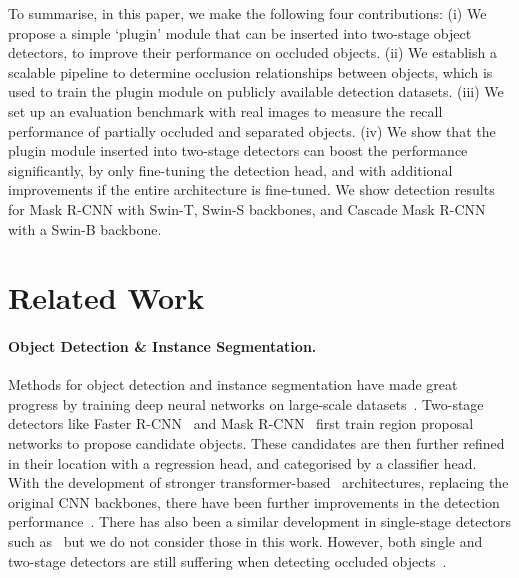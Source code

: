 \documentclass{bmvc2k}
\begin{document}
To summarise, in this paper, we make the following four contributions:
(i) We propose a simple `plugin' module that can be inserted into two-stage object detectors, to improve their performance on occluded objects.
(ii) We establish a scalable pipeline to determine occlusion relationships between objects,
which is used to train the plugin module on publicly available detection datasets.
(iii) We set up an evaluation benchmark with real images to measure the recall performance of partially occluded and separated objects.
(iv) We show that the plugin module inserted into two-stage detectors can boost the performance significantly, by only fine-tuning the detection head, and with additional improvements if 
the entire architecture is fine-tuned. We show detection results for Mask R-CNN with Swin-T, Swin-S backbones, and Cascade Mask R-CNN with a Swin-B backbone.





 \vspace{-0.4cm}
\section{Related Work}
\label{sec:related_work}


\paragraph{Object Detection \& Instance Segmentation.}
Methods for
object detection and instance segmentation have made great progress
by training deep neural networks on large-scale datasets~\cite{everingham2010pascal, coco_dataset, openimages_2020}.
Two-stage detectors like Faster R-CNN~\cite{faster_rcnn} and Mask R-CNN~\cite{mask_rcnn} first train region proposal networks to propose candidate objects. These candidates are then further refined in their location with a regression head, and categorised by a classifier head. With the development of stronger transformer-based~\cite{liu2021Swin, liu2021swinv2} architectures, replacing the original CNN backbones, there have been further improvements in the detection performance~\cite{liu2021Swin}. There has also been a similar development in single-stage detectors such as~\cite{carion2020detr, zhu2020deformable_detr, cheng2022masked} but we do not consider those in this work.
However, both single and two-stage detectors are still suffering when detecting occluded objects~\cite{saleh2021survey_occlusion}. 
\\[-0.9cm]
\end{document}
